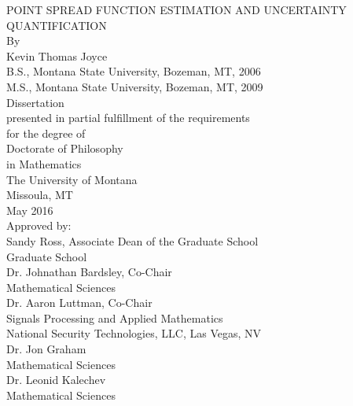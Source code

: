 
\begin{titlepage}

\begin{center}
    \Large POINT SPREAD FUNCTION ESTIMATION AND UNCERTAINTY QUANTIFICATION\\ %
	\vspace{.5cm}
    \normalsize By\\
    \vspace{.5cm}
      Kevin Thomas Joyce\\                                    %
    \vspace{.5cm}
      B.S., Montana State University, Bozeman, MT, 2006\\ 
      M.S., Montana State University, Bozeman, MT, 2009\\   %
    \vspace{.5cm}
	Dissertation\\
	\vspace{.5cm}
    presented in partial fulfillment of the requirements\\
    for the degree of\\
    \vspace{.5cm}
    Doctorate of Philosophy\\
	in Mathematics\\
    \vspace{.5cm}
    The University of Montana\\
	Missoula, MT\\
    \vspace{.5cm}
    May 2016\\                                               %
	\vspace{.5cm}
	Approved by:\\
	\vspace{.5cm}
	Sandy Ross, Associate Dean of the Graduate School\\  %
	Graduate School\\
	\vspace{.5cm}
	Dr. Johnathan Bardsley, Co-Chair\\  %
	Mathematical Sciences\\
	\vspace{.5cm}
	Dr. Aaron Luttman, Co-Chair\\  %
	Signals Processing and Applied Mathematics\\
	National Security Technologies, LLC, Las Vegas, NV\\
	\vspace{.5cm}
	Dr. Jon Graham\\  %
	Mathematical Sciences\\
	\vspace{.5cm}
	Dr. Leonid Kalechev\\  %
	Mathematical Sciences\\
\end{center}

\vspace{1.25in}


\pagebreak

\end{titlepage}
